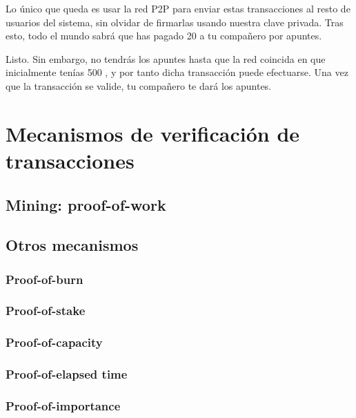\documentclass[10pt, a4paper]{article}
\newcommand\dout{\bgroup \markoverwith{\rule[0.2ex]{0.1pt}{0.4pt}\rule[0.8ex]{0.1pt}{0.4pt}}\ULon}
\def\dout{\bgroup
 \markoverwith{\lower-0.35ex\hbox
 {\kern-.03em\vbox{\hrule width.2em\kern0.45ex\hrule}\kern-.03em}}%
 \ULon}
\theoremstyle{theorem-style}
\theoremstyle{theorem-style}
\theoremstyle{definition-style}
\theoremstyle{remark-style}
\theoremstyle{example-style}
\theoremstyle{definition-style}
\theoremstyle{remark-style}
\begin{document}
Lo único que queda es usar la red P2P para enviar estas transacciones al
resto de usuarios del sistema, sin olvidar de firmarlas usando nuestra
clave privada. Tras esto, todo el mundo sabrá que has pagado 20 \dout{D}
a tu compañero por apuntes.

Listo. Sin embargo, no tendrás los apuntes hasta que la red coincida en
que inicialmente tenías 500 \dout{D}, y por tanto dicha transacción
puede efectuarse. Una vez que la transacción se valide, tu compañero te
dará los apuntes.

\section{Mecanismos de verificación de
transacciones}\label{mecanismos-de-verificaciuxf3n-de-transacciones}

\subsection{Mining: proof-of-work}\label{mining-proof-of-work}

\subsection{Otros mecanismos}\label{otros-mecanismos}

\subsubsection{Proof-of-burn}\label{proof-of-burn}

\subsubsection{Proof-of-stake}\label{proof-of-stake}

\subsubsection{Proof-of-capacity}\label{proof-of-capacity}

\subsubsection{Proof-of-elapsed time}\label{proof-of-elapsed-time}

\subsubsection{Proof-of-importance}\label{proof-of-importance}
\end{document}
